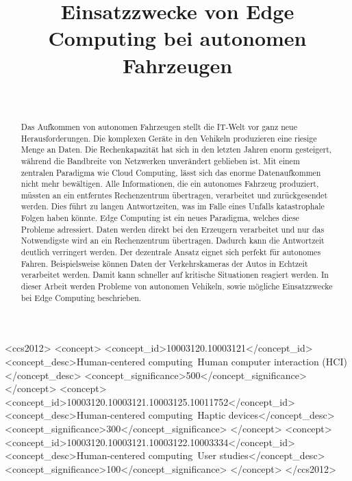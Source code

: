 \documentclass{sigchi}
\def\plaintitle{Einsatzzwecke von Edge Computing bei autonomen Fahrzeugen}
\begin{document}
\title{\plaintitle}

\author{%
   \\
}

\maketitle

\begin{abstract}
Das Aufkommen von autonomen Fahrzeugen stellt die IT-Welt vor ganz neue Herausforderungen. Die komplexen Geräte in den Vehikeln produzieren eine riesige Menge an Daten. Die Rechenkapazität hat sich in den letzten Jahren enorm gesteigert, während die Bandbreite von Netzwerken unverändert geblieben ist. Mit einem zentralen Paradigma wie Cloud Computing, lässt sich das enorme Datenaufkommen nicht mehr bewältigen. Alle Informationen, die ein autonomes Fahrzeug produziert, müssten an ein entferntes Rechenzentrum übertragen, verarbeitet und zurückgesendet werden. Dies führt zu langen Antwortzeiten, was im Falle eines Unfalls katastrophale Folgen haben könnte. Edge Computing ist ein neues Paradigma, welches diese Probleme adressiert. Daten werden direkt bei den Erzeugern verarbeitet und nur das Notwendigste wird an ein Rechenzentrum übertragen. Dadurch kann die Antwortzeit deutlich verringert werden. Der dezentrale Ansatz eignet sich perfekt für autonomes Fahren. Beispielsweise können Daten der Verkehrskameras der Autos in Echtzeit verarbeitet werden. Damit kann schneller auf kritische Situationen reagiert werden. In dieser Arbeit werden Probleme von autonomen Vehikeln, sowie mögliche Einsatzzwecke bei Edge Computing beschrieben.
\end{abstract}


\iffalse

\begin{CCSXML}
    <ccs2012>
    <concept>
    <concept_id>10003120.10003121</concept_id>
    <concept_desc>Human-centered computing~Human computer interaction (HCI)</concept_desc>
    <concept_significance>500</concept_significance>
    </concept>
    <concept>
    <concept_id>10003120.10003121.10003125.10011752</concept_id>
    <concept_desc>Human-centered computing~Haptic devices</concept_desc>
    <concept_significance>300</concept_significance>
    </concept>
    <concept>
    <concept_id>10003120.10003121.10003122.10003334</concept_id>
    <concept_desc>Human-centered computing~User studies</concept_desc>
    <concept_significance>100</concept_significance>
    </concept>
    </ccs2012>
    \end{CCSXML}
    
\end{document}

